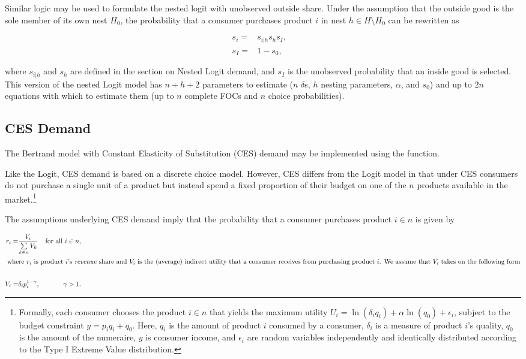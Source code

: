 \documentclass[11pt,numbers=noenddot,pointlessnumbers]{scrreprt}
\numberwithin{equation}{section}
\begin{document}
 Similar logic may be used to formulate the nested logit with
 unobserved outside share. Under the assumption that the outside good is
 the sole member of its own nest $H_0$, the probability that a consumer
 purchases product $i$ in nest $h\in H\setminus H_0$ can be rewritten as

 \begin{align*}
   s_i=& s_{i|h}s_{h}s_I,&\\
   s_I=&1-s_0,&
 \end{align*}

 where $s_{i|h}$ and $s_h$ are defined in the section on Nested Logit
 demand, and $s_I$ is the unobserved probability that an inside good is
 selected. This version of the nested Logit model  has $n+h+2$ parameters to estimate ($n$ $\delta$s,
 $h$ nesting parameters, $\alpha$, and $s_0$) and up to $2n$ equations with which to estimate them (up to
 $n$ complete FOCs and $n$ choice probabilities).



\subsection{CES Demand}

The Bertrand model with Constant Elasticity of Substitution (CES) demand may be implemented using the
\verb@ces@ function.

Like the Logit, CES demand is based on a discrete
choice model. However, CES differs from the Logit model in that under CES
consumers do not purchase a single unit of a product but instead spend
a fixed proportion of their budget on one of the $n$ products
available in the market.\footnote{Formally, each consumer chooses the
  product $i \in n$ that yields the maximum utility $U_i=\ln(\delta_iq_i) +\alpha \ln(q_0) +
  \epsilon_i$, subject to the budget constraint $y=p_iq_i+q_0$. Here,
  $q_i$ is the amount of product $i$ consumed by a consumer, $\delta_i$
  is a measure of product $i$'s quality, $q_0$ is
  the amount of the numeraire, $y$ is consumer income, and
  $\epsilon_i$ are random variables independently and identically
  distributed according to the Type I Extreme Value distribution.}

The assumptions underlying CES demand imply that the probability that a consumer
purchases product $i \in n$ is given by


\begin{align*}
  r_i=& \frac{V_i}{\sum\limits_{k \in n}V_k}& \mbox{for all $i \in n$},\\
  \intertext{ where $r_i$ is product $i$'s \emph{revenue} share  and
    $V_i$ is the (average) indirect utility that a consumer
    receives from purchasing product $i$. We assume that $V_i$ takes on
    the following form}\\
  V_i=&\delta_ip_i^{1-\gamma},&\gamma > 1 .
\end{align*}
\end{document}
